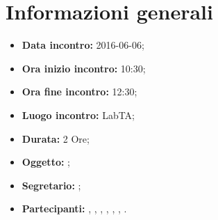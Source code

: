 \newpage
\section{Informazioni generali}
\begin{itemize}
\item \textbf{Data incontro:} 2016-06-06;
\item \textbf{Ora inizio incontro:} 10:30;
\item \textbf{Ora fine incontro:} 12:30;
\item \textbf{Luogo incontro:} LabTA;
\item \textbf{Durata:} 2 Ore;
\item \textbf{Oggetto:} ;
\item \textbf{Segretario:} \GR;
\item \textbf{Partecipanti:} \AF, \FB, \GN, \GR, \MV, \MP, \SM.

\end{itemize}
